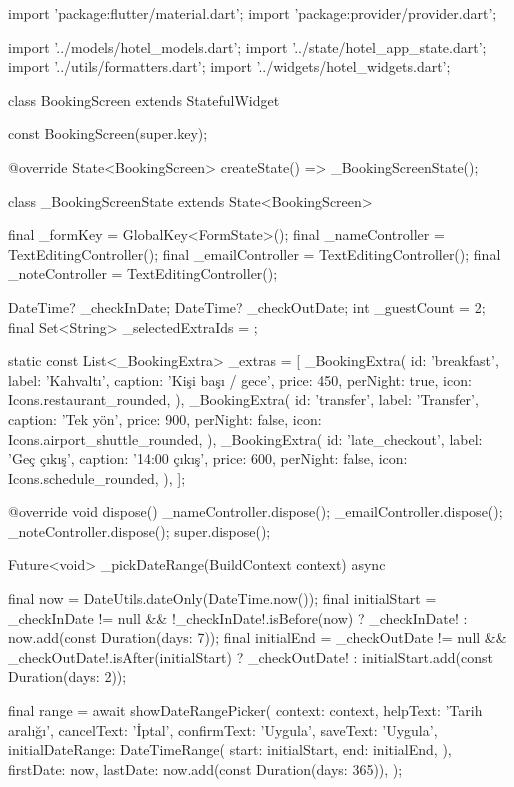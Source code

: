 \documentclass[11pt,a4paper]{article}
\begin{document}
\begin{codeblock}
import 'package:flutter/material.dart';
import 'package:provider/provider.dart';

import '../models/hotel_models.dart';
import '../state/hotel_app_state.dart';
import '../utils/formatters.dart';
import '../widgets/hotel_widgets.dart';

class BookingScreen extends StatefulWidget {
  const BookingScreen({super.key});

  @override
  State<BookingScreen> createState() => _BookingScreenState();
}

class _BookingScreenState extends State<BookingScreen> {
  final _formKey = GlobalKey<FormState>();
  final _nameController = TextEditingController();
  final _emailController = TextEditingController();
  final _noteController = TextEditingController();

  DateTime? _checkInDate;
  DateTime? _checkOutDate;
  int _guestCount = 2;
  final Set<String> _selectedExtraIds = {};

  static const List<_BookingExtra> _extras = [
    _BookingExtra(
      id: 'breakfast',
      label: 'Kahvaltı',
      caption: 'Kişi başı / gece',
      price: 450,
      perNight: true,
      icon: Icons.restaurant_rounded,
    ),
    _BookingExtra(
      id: 'transfer',
      label: 'Transfer',
      caption: 'Tek yön',
      price: 900,
      perNight: false,
      icon: Icons.airport_shuttle_rounded,
    ),
    _BookingExtra(
      id: 'late_checkout',
      label: 'Geç çıkış',
      caption: '14:00 çıkış',
      price: 600,
      perNight: false,
      icon: Icons.schedule_rounded,
    ),
  ];

  @override
  void dispose() {
    _nameController.dispose();
    _emailController.dispose();
    _noteController.dispose();
    super.dispose();
  }

  Future<void> _pickDateRange(BuildContext context) async {
    final now = DateUtils.dateOnly(DateTime.now());
    final initialStart = _checkInDate != null && !_checkInDate!.isBefore(now)
        ? _checkInDate!
        : now.add(const Duration(days: 7));
    final initialEnd =
        _checkOutDate != null && _checkOutDate!.isAfter(initialStart)
            ? _checkOutDate!
            : initialStart.add(const Duration(days: 2));

    final range = await showDateRangePicker(
      context: context,
      helpText: 'Tarih aralığı',
      cancelText: 'İptal',
      confirmText: 'Uygula',
      saveText: 'Uygula',
      initialDateRange: DateTimeRange(
        start: initialStart,
        end: initialEnd,
      ),
      firstDate: now,
      lastDate: now.add(const Duration(days: 365)),
    );

}}
\end{codeblock}
\end{document}
